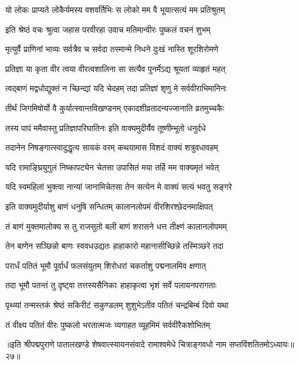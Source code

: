 \twolineshloka
{यो लोकः प्राप्यते लोकैर्यमस्य वशवर्तिभिः}
{स लोको मम वै भूयात्सत्यं मम प्रतिश्रुतम्}%

\twolineshloka
{इति श्रेष्ठं वचः श्रुत्वा जहास परवीरहा}
{उवाच मतिमान्वीरः पुष्कलं वचनं शुभम्}%

\twolineshloka
{मृत्युर्वै प्राणिनां भाव्यः सर्वत्रैव च सर्वदा}
{तस्मान्मे निधने दुःखं नास्ति शूरशिरोमणे}%

\twolineshloka
{प्रतिज्ञा या कृता वीर त्वया वीरत्वशालिना}
{सा सत्यैव पुनर्मेऽद्य श्रूयतां व्याहृतं महत्}%

\twolineshloka
{त्वद्बाणं मद्वधोद्युक्तं न च्छिन्द्यां यदि चेदहम्}
{तदा प्रतिज्ञां शृणु मे सर्ववीराभिमानिनः}%

\twolineshloka
{तीर्थं जिगमिषोर्यो वै कुर्यात्स्वान्तविखण्डनम्}
{एकादशीव्रतादन्यज्जानाति व्रतमुच्चकैः}%

\twolineshloka
{तस्य पापं ममैवास्तु प्रतिज्ञापरिघातिनः}
{इति वाक्यमुदीर्यैव तूष्णीम्भूतो धनुर्दधे}%

\twolineshloka
{तदानेन निषङ्गात्स्वादुद्धृत्य सायकं वरम्}
{कथयामास विशदं वाक्यं शत्रुवधावहम्}%


\twolineshloka
{यदि रामाङ्घ्रियुगुलं निष्कापट्येन चेतसा}
{उपासितं मया तर्हि मम वाक्यमृतं भवेत्}%

\twolineshloka
{यदि स्वमहिलां भुक्त्वा नान्यां जानामिचेतसा}
{तेन सत्येन मे वाक्यं सत्यं भवतु सङ्गरे}%

\twolineshloka
{इति वाक्यमुदीर्याशु बाणं धनुषि सन्धितम्}
{कालानलोपमं वीरशिरश्छेदनमाक्षिपत्}%

\twolineshloka
{तं बाणं मुक्तमालोक्य स तु राजसुतो बली}
{बाणं शरासने धत्त तीक्ष्णं कालानलोपमम्}%

\twolineshloka
{तेन बाणेन सञ्छिन्नो बाणः स्ववधउद्यतः}
{हाहाकारो महानासीच्छिन्ने तस्मिञ्छरे तदा}%

\twolineshloka
{परार्धं पतितं भूमौ पूर्वार्धं फलसंयुतम्}
{शिरोधरां चकर्ताशु पद्मनालमिव क्षणात्}%

\twolineshloka
{तदा भूमौ पतन्तं तु दृष्ट्वा तत्तस्यसैनिकाः}
{हाहाकृत्वा भृशं सर्वे पलायनपरागताः}%

\twolineshloka
{पृथ्व्यां तन्मस्तकं श्रेष्ठं सकिरीटं सकुण्डलम्}
{शुशुभेऽतीव पतितं चन्द्रबिम्बं दिवो यथा}%

\twolineshloka
{तं वीक्ष्य पतितं वीरः पुष्कलो भरतात्मजः}
{व्यगाहत व्यूहमिमं सर्ववीरैकशोभितम्}%

॥इति श्रीपद्मपुराणे पातालखण्डे शेषवात्स्यायनसंवादे रामाश्वमेधे चित्राङ्गवधो नाम सप्तविंशतितमोऽध्यायः॥२७॥

